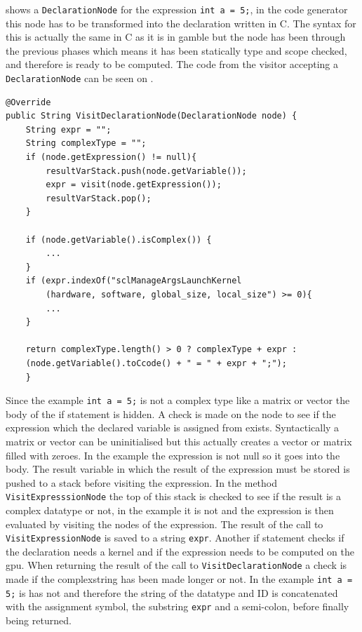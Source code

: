  shows a \texttt{DeclarationNode} for the expression \texttt{int a = 5;}, in the code generator this node has to be transformed into the declaration written in C. 
The syntax for this is actually the same in C as it is in \gls{gamble} but the node has been through the previous phases which means it has been statically type and scope checked, and therefore is ready to be computed.
The code from the visitor accepting a \texttt{DeclarationNode} can be seen on .
\begin{lstlisting}[float, floatplacement=H!, caption=The visit method for visitting a DeclarationNode in the codegenerator. ,numbers=none,frame=tlrb,label={lst:DeclarationNodeCodeGen}]
@Override
public String VisitDeclarationNode(DeclarationNode node) {
    String expr = "";
    String complexType = "";
    if (node.getExpression() != null){
        resultVarStack.push(node.getVariable());
        expr = visit(node.getExpression());
        resultVarStack.pop();
    }

    if (node.getVariable().isComplex()) {
        ...
    }
    if (expr.indexOf("sclManageArgsLaunchKernel
    	(hardware, software, global_size, local_size") >= 0){
        ...
    }
    
    return complexType.length() > 0 ? complexType + expr : 
    (node.getVariable().toCcode() + " = " + expr + ";");
    }
\end{lstlisting}
Since the example \texttt{int a = 5;} is not a complex type like a matrix or vector the body of the if statement is hidden.
A check is made on the node to see if the expression which the declared variable is assigned from exists. 
Syntactically a matrix or vector can be uninitialised but this actually creates a vector or matrix filled with zeroes.
In the example the expression is not null so it goes into the body.
The result variable in which the result of the expression must be stored is pushed to a stack before visiting the expression.
In the method \texttt{VisitExpresssionNode} the top of this stack is checked to see if the result is a complex datatype or not, in the example it is not and the expression is then evaluated by visiting the nodes of the expression.
The result of the call to \texttt{VisitExpressionNode} is saved to a string \texttt{expr}.
Another if statement checks if the declaration needs a kernel and if the expression needs to be computed on the \acrshort{gpu}.
When returning the result of the call to \texttt{VisitDeclarationNode} a check is made if the complexstring has been made longer or not.
In the example \texttt{int a = 5;} is has not and therefore the string of the datatype and ID is concatenated with the assignment symbol, the substring \texttt{expr} and a semi-colon, before finally being returned.



